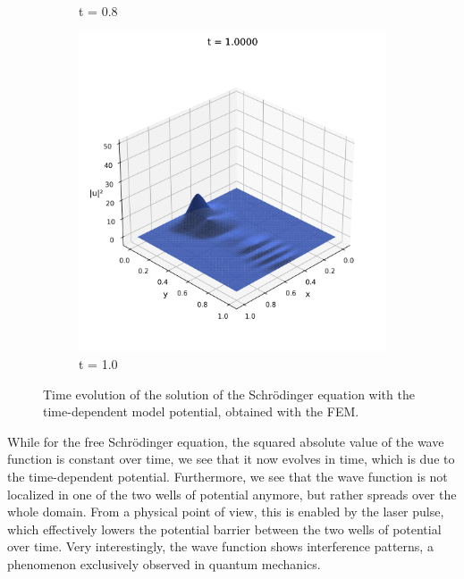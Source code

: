 \documentclass{article}
\theoremstyle{definition}
\theoremstyle{plain}
\theoremstyle{remark}
\begin{document}
\begin{figure}[h]
\begin{subfigure}[b]{0.3\textwidth}
    \caption{t = 0.8}
  \end{subfigure}
  \hfill
  \begin{subfigure}[b]{0.3\textwidth}
    \centering
    \includegraphics[width=\textwidth, trim=0cm 0cm 0cm 1cm, clip]{figures/fem_potential_frame_0100.png}
    \caption{t = 1.0}
  \end{subfigure}
  \caption{Time evolution of the solution of the Schrödinger equation with the time-dependent model potential, obtained with the FEM.}
  \label{fig:potential_evolution_fem}
\end{figure}

While for the free Schrödinger equation, the squared absolute value of the wave function is constant over time, we see that it now evolves in time, which is due to the time-dependent potential. Furthermore, we see that the wave function is not localized in one of the two wells of potential anymore, but rather spreads over the whole domain. From a physical point of view, this is enabled by the laser pulse, which effectively lowers the potential barrier between the two wells of potential over time. Very interestingly, the wave function shows interference patterns, a phenomenon exclusively observed in quantum mechanics.

\newpage
\end{document}
